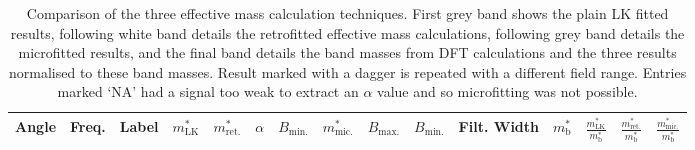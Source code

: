\begin{table}
    \begin{center}
        \caption{Comparison of the three effective mass calculation techniques. First grey band shows the plain \ac{LK} fitted results, following white band details the retrofitted effective mass calculations, following grey band details the microfitted results, and the final band details the band masses from DFT calculations and the three results normalised to these band masses. Result marked with a dagger is repeated with a different field range. Entries marked `NA' had a signal too weak to extract an $\alpha$ value and so microfitting was not possible.}
{\small
        \begin{tabular}[htbp]{rrlrrrrrrrrrrrr}
\toprule
Angle	& Freq.	& Label	& $m^*_{\textrm{LK}}$	& $m^*_{\textrm{ret.}}$	& $\alpha$	& $B_{\textrm{min.}}$	& $m^*_{\textrm{mic.}}$	& $B_{\textrm{max.}}$	& $B_{\textrm{min.}}$	& Filt. Width	& $m^*_{\textrm{b}}$	& $\frac{m^*_{\textrm{LK}}}{m^*_{\textrm{b}}}$	& $\frac{m^*_{\textrm{ret.}}}{m^*_{\textrm{b}}}$	& $\frac{m^*_{\textrm{mic.}}}{m^*_{\textrm{b}}}$ \\
\midrule

\bottomrule
        \end{tabular}
}
        \label{Tab:ResD:EffectiveMassResults}
    \end{center}
\end{table}
